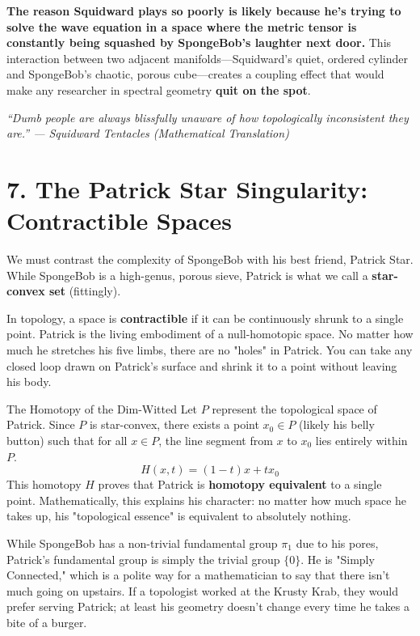\documentclass[12pt]{article}
\begin{document}
\textbf{The reason Squidward plays so poorly is likely because he’s trying to solve the wave equation in a space where the metric tensor is constantly being squashed by SpongeBob’s laughter next door.} This interaction between two adjacent manifolds—Squidward’s quiet, ordered cylinder and SpongeBob’s chaotic, porous cube—creates a coupling effect that would make any researcher in spectral geometry \textbf{quit on the spot}.

\begin{center}
\textit{``Dumb people are always blissfully unaware of how topologically inconsistent they are.'' --- Squidward Tentacles (Mathematical Translation)}
\end{center}

\section{7. The Patrick Star Singularity: Contractible Spaces}
We must contrast the complexity of SpongeBob with his best friend, Patrick Star. While SpongeBob is a high-genus, porous sieve, Patrick is what we call a \textbf{star-convex set} (fittingly). 

In topology, a space is \textbf{contractible} if it can be continuously shrunk to a single point. Patrick is the living embodiment of a null-homotopic space. No matter how much he stretches his five limbs, there are no "holes" in Patrick. You can take any closed loop drawn on Patrick's surface and shrink it to a point without leaving his body.

\begin{proofbox}{The Homotopy of the Dim-Witted}
Let $P$ represent the topological space of Patrick. Since $P$ is star-convex, there exists a point $x_0 \in P$ (likely his belly button) such that for all $x \in P$, the line segment from $x$ to $x_0$ lies entirely within $P$. 
\begin{equation}
H(x, t) = (1-t)x + tx_0
\end{equation}
This homotopy $H$ proves that Patrick is \textbf{homotopy equivalent} to a single point. Mathematically, this explains his character: no matter how much space he takes up, his "topological essence" is equivalent to absolutely nothing. 
\end{proofbox}

While SpongeBob has a non-trivial fundamental group $\pi_1$ due to his pores, Patrick’s fundamental group is simply the trivial group $\{0\}$. He is "Simply Connected," which is a polite way for a mathematician to say that there isn't much going on upstairs. If a topologist worked at the Krusty Krab, they would prefer serving Patrick; at least his geometry doesn't change every time he takes a bite of a burger.
\end{document}
